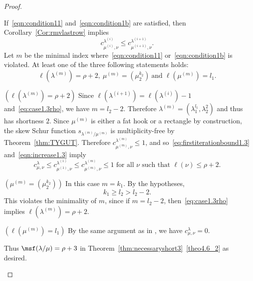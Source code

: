 \begin{proof}
\begin{Case}
If~\eqref{eqn:condition11} and~\eqref{eqn:condition1b} are satisfied, then Corollary~\ref{Cor:rmvlastrow} implies
\begin{equation}\label{eqn:increase1.3}
 c^{\lambda^{(i)}}_{\mu^{(i)},\nu} \leq c^{\lambda^{(i+1)}}_{\mu^{(i+1)},\nu}.
\end{equation}
Let $m$ be the minimal index where~\eqref{eqn:condition11} or~\eqref{eqn:condition1b} is violated. At least one of the three following statements holds: 
\[
\ell(\lambda^{(m)}) = \rho+2,\ \mu^{(m)} = (\mu_2^{k_2})\ \text{and } \ell(\mu^{(m)}) = l_1.
\]
\end{Case}

\begin{Case}
{ $(\ell(\lambda^{(m)}) = \rho+2)$} 
Since $\ell(\lambda^{(i+1)}) = \ell(\lambda^{(i)})-1$ and~\eqref{eq:case1.3rho}, we have $m = l_2-2$. Therefore $\lambda^{(m)} = (\lambda_1^{l_1},\lambda_2^{2})$ and thus has shortness $2$. Since $\mu^{(m)}$ is either a fat hook or a rectangle by construction, the skew Schur function $s_{\lambda^{(m)}/\mu^{(m)}}$ is multiplicity-free by Theorem~\ref{thm:TYGUT}. Therefore $c^{\lambda^{(m)}}_{\mu^{(m)},\nu} \leq 1$, and so~\eqref{eq:firstiterationbound1.3} and~\eqref{eqn:increase1.3} imply
\[
c^{\lambda}_{\mu,\nu} \leq c^{\lambda^{(1)}}_{\mu^{(1)},\nu}\leq c^{\lambda^{(m)}}_{\mu^{(m)},\nu} \leq 1\text{ for all }\nu\text{ such that }\ell(\nu)\leq \rho+2.
\]
\end{Case}

\begin{Case}
{ $(\mu^{(m)} = (\mu_2^{k_2}))$} 
In this case $m = k_1$. By the  hypotheses,
\[
k_1 \geq l_2 > l_2-2.
\]
This violates the minimality of $m$, since if $m=l_2 - 2$, then~\eqref{eq:case1.3rho} implies $\ell(\lambda^{(m)}) = \rho+2$.
\end{Case}

\begin{Case}
{ $(\ell(\mu^{(m)}) = l_1)$} 
By the same argument as in , we have $c^{\lambda}_{\mu,\nu} = 0$. 

Thus ${\msf }(\lambda/\mu) = \rho+3$ in Theorem~\ref{thm:necessaryshort3}~\ref{theo4.6_2} as desired.
\end{Case}


\end{proof}
